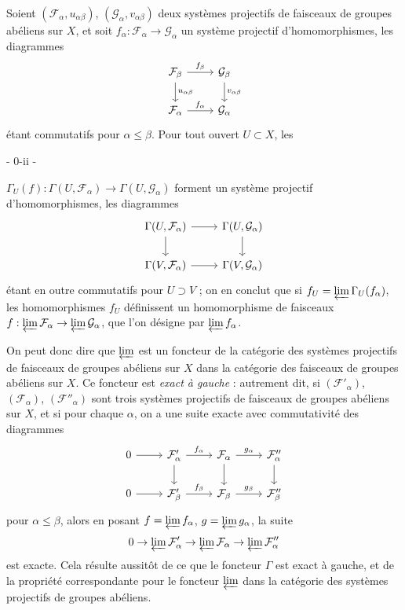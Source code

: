 Soient $(\mathcal{F}_\alpha, u_{\alpha\beta})$, $(\mathcal{G}_\alpha, v_{\alpha\beta})$ deux systèmes projectifs de faisceaux de groupes abéliens sur $X$, et soit $f_\alpha : \mathcal{F}_\alpha \to \mathcal{G}_\alpha$ un système projectif d'homomorphismes, les diagrammes
$$
\begin{tikzcd}
\mathcal{F}_\beta \arrow[r, "f_\beta"] \arrow[d, "u_{\alpha\beta}"] & \mathcal{G}_\beta \arrow[d, "v_{\alpha\beta}"] \\
\mathcal{F}_\alpha \arrow[r, "f_\alpha"] & \mathcal{G}_\alpha
\end{tikzcd}
$$
étant commutatifs pour $\alpha \le \beta$. Pour tout ouvert $U \subset X$, les

\newpage


- 0-ii -

$\Gamma_U(f) : \Gamma(U, \mathcal{F}_\alpha) \to \Gamma(U, \mathcal{G}_\alpha)$ forment un système projectif d'homomorphismes, les diagrammes
$$\begin{tikzcd}
\Gamma(U, \mathcal{F}_\alpha) \arrow[r] \arrow[d] & \Gamma(U, \mathcal{G}_\alpha) \arrow[d] \\
\Gamma(V, \mathcal{F}_\alpha) \arrow[r] & \Gamma(V, \mathcal{G}_\alpha)
\end{tikzcd}$$
étant en outre commutatifs pour $U \supset V$ ; on en conclut que si $f_U = \varprojlim \Gamma_U(f_\alpha)$, les homomorphismes $f_U$ définissent un homomorphisme de faisceaux $f : \varprojlim \mathcal{F}_\alpha \to \varprojlim \mathcal{G}_\alpha$, que l'on désigne par $\varprojlim f_\alpha$.

On peut donc dire que $\varprojlim$ est un foncteur de la catégorie des systèmes projectifs de faisceaux de groupes abéliens sur $X$ dans la catégorie des faisceaux de groupes abéliens sur $X$. Ce foncteur est \emph{exact à gauche} : autrement dit, si $(\mathcal{F}'_\alpha)$, $(\mathcal{F}_\alpha)$, $(\mathcal{F}''_\alpha)$ sont trois systèmes projectifs de faisceaux de groupes abéliens sur $X$, et si pour chaque $\alpha$, on a une suite exacte avec commutativité des diagrammes
$$\begin{tikzcd}
0 \arrow[r] & \mathcal{F}'_\alpha \arrow[r, "f_\alpha"] \arrow[d] & \mathcal{F}_\alpha \arrow[r, "g_\alpha"] \arrow[d] & \mathcal{F}''_\alpha \arrow[d] \\
0 \arrow[r] & \mathcal{F}'_\beta \arrow[r, "f_\beta"] & \mathcal{F}_\beta \arrow[r, "g_\beta"] & \mathcal{F}''_\beta
\end{tikzcd}$$
pour $\alpha \leq \beta$, alors en posant $f = \varprojlim f_\alpha$, $g = \varprojlim g_\alpha$, la suite
$$0 \to \varprojlim \mathcal{F}'_\alpha \to \varprojlim \mathcal{F}_\alpha \to \varprojlim \mathcal{F}''_\alpha$$
est exacte. Cela résulte aussitôt de ce que le foncteur $\Gamma$ est exact à gauche, et de la propriété correspondante pour le foncteur $\varprojlim$ dans la catégorie des systèmes projectifs de groupes abéliens.

